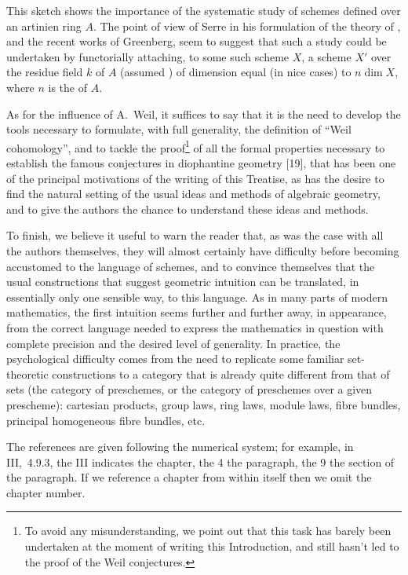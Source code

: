 \documentclass[../main.tex]{subfiles}
\begin{document}
This sketch shows the importance of the systematic study of schemes defined over an artinien ring $A$.
The point of view of Serre in his formulation of the theory of , and the recent works of Greenberg, seem to suggest that such a study could be undertaken by functorially attaching, to some such scheme $X$, a scheme $X'$ over the residue field $k$ of $A$ (assumed ) of dimension equal (in nice cases) to $n\dim X$, where $n$ is the  of $A$.

As for the influence of A.~Weil, it suffices to say that it is the need to develop the tools necessary to formulate, with full generality, the definition of ``Weil cohomology'', and to tackle the proof\footnote[1]{To avoid any misunderstanding, we point out that this task has barely been undertaken at the moment of writing this Introduction, and still hasn't led to the proof of the Weil conjectures.} of all the formal properties necessary to establish the famous conjectures in diophantine geometry [19], that has been one of the principal motivations of the writing of this Treatise, as has the desire to find the natural setting of the usual ideas and methods of algebraic geometry, and to give the authors the chance to understand these ideas and methods.

\asttri

To finish, we believe it useful to warn the reader that, as was the case with all the authors themselves, they will almost certainly have difficulty before becoming accustomed to the language of schemes, and to convince themselves that the usual constructions that suggest geometric intuition can be translated, in essentially only one sensible way, to this language.
As in many parts of modern mathematics, the first intuition seems further and further away, in appearance, from the correct language needed to express the mathematics in question with complete precision and the desired level of generality.
In practice, the psychological difficulty comes from the need to replicate some familiar set-theoretic constructions to a category that is already quite different from that of sets (the category of preschemes, or the category of preschemes over a given prescheme): cartesian products, group laws, ring laws, module laws, fibre bundles, principal homogeneous fibre bundles, etc.


\asttri

The references are given following the numerical system; for example, in III,~4.9.3, the III indicates the chapter, the 4 the paragraph, the 9 the section of the paragraph.
If we reference a chapter from within itself then we omit the chapter number.
\end{document}
